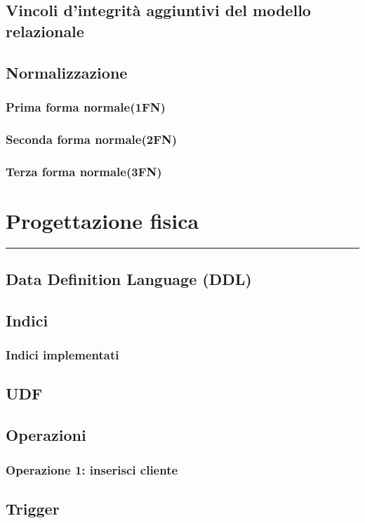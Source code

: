 \documentclass[legalpaper]{article}
\begin{document}
\subsection{Vincoli d'integrità aggiuntivi del modello relazionale}

\subsection{Normalizzazione}
\subsubsection{Prima forma normale(1FN)}
\subsubsection{Seconda forma normale(2FN)}
\subsubsection{Terza forma normale(3FN)}

\newpage
\section{Progettazione fisica}
\rule{\linewidth}{1.5pt}
\subsection{Data Definition Language (DDL)}
\subsection{Indici}
\subsubsection{Indici implementati}
\subsection{UDF}
\subsection{Operazioni}
\subsubsection{Operazione 1: inserisci cliente}
\subsection{Trigger}
\end{document}
